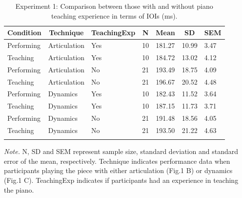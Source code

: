 \documentclass[
  man,floatsintext]{apa6}
\begin{document}
\begin{table}[tbp]

\begin{center}
\begin{threeparttable}

\caption{\label{tab:ioi-teaching-desc-1}Experiment 1: Comparison between those with and without piano teaching experience in terms of IOIs (ms).}

\begin{tabular}{lllllll}
\toprule
Condition & \multicolumn{1}{c}{Technique} & \multicolumn{1}{c}{TeachingExp} & \multicolumn{1}{c}{N} & \multicolumn{1}{c}{Mean} & \multicolumn{1}{c}{SD} & \multicolumn{1}{c}{SEM}\\
\midrule
Performing & Articulation & Yes & 10 & 181.27 & 10.99 & 3.47\\
Teaching & Articulation & Yes & 10 & 184.72 & 13.02 & 4.12\\
Performing & Articulation & No & 21 & 193.49 & 18.75 & 4.09\\
Teaching & Articulation & No & 21 & 196.67 & 20.52 & 4.48\\
Performing & Dynamics & Yes & 10 & 182.43 & 11.52 & 3.64\\
Teaching & Dynamics & Yes & 10 & 187.15 & 11.73 & 3.71\\
Performing & Dynamics & No & 21 & 191.48 & 18.56 & 4.05\\
Teaching & Dynamics & No & 21 & 193.50 & 21.22 & 4.63\\
\bottomrule
\addlinespace
\end{tabular}

\begin{tablenotes}[para]
\normalsize{\textit{Note.} N, SD and SEM represent sample size, standard deviation and standard error of the mean, respectively. Technique indicates performance data when participants playing the piece with either articulation (Fig.1 B) or dynamics (Fig.1 C). TeachingExp indicates if participants had an experience in teaching the piano.}
\end{tablenotes}

\end{threeparttable}
\end{center}

\end{table}
\end{document}
